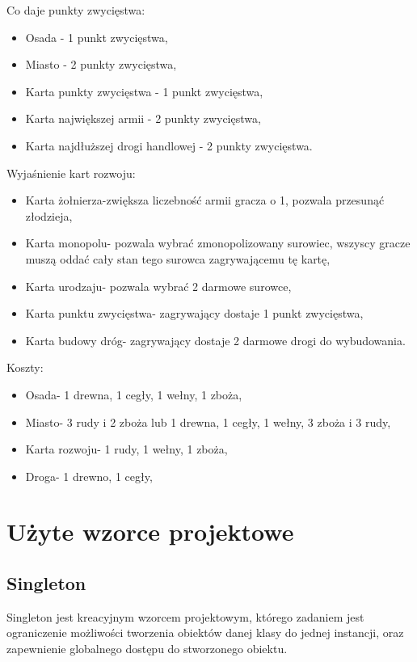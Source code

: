 \documentclass[a4paper, 11pt]{article}
\begin{document}
Co daje punkty zwycięstwa:
\begin{itemize}
\item Osada - 1 punkt zwycięstwa,
\item Miasto - 2 punkty zwycięstwa,
\item Karta punkty zwycięstwa - 1 punkt zwycięstwa,
\item Karta największej armii - 2 punkty zwycięstwa,
\item Karta najdłuższej drogi handlowej - 2 punkty zwycięstwa.
\end{itemize}

Wyjaśnienie kart rozwoju:
\begin{itemize}
\item Karta żołnierza-zwiększa liczebność armii gracza o 1, pozwala przesunąć złodzieja,
\item Karta monopolu- pozwala wybrać zmonopolizowany surowiec, wszyscy gracze muszą oddać cały stan tego surowca zagrywającemu tę kartę,
\item Karta urodzaju- pozwala wybrać 2 darmowe surowce,
\item Karta punktu zwycięstwa- zagrywający dostaje 1 punkt zwycięstwa,
\item Karta budowy dróg- zagrywający dostaje 2 darmowe drogi do wybudowania.
\end{itemize}
Koszty:
\begin{itemize}
\item Osada-  1 drewna, 1 cegły, 1 wełny, 1 zboża,
\item Miasto-  3 rudy i 2 zboża lub 1 drewna, 1 cegły, 1 wełny, 3 zboża i 3 rudy,
\item Karta rozwoju-  1 rudy, 1 wełny, 1 zboża,
\item Droga-  1 drewno, 1 cegły,
\end{itemize}


	
	
	\section{Użyte wzorce projektowe}
	\subsection{Singleton}
\indent

Singleton jest kreacyjnym wzorcem projektowym, którego zadaniem jest ograniczenie możliwości tworzenia obiektów danej klasy do jednej instancji, oraz zapewnienie globalnego dostępu do stworzonego obiektu.
\end{document}
